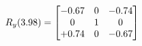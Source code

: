 \documentclass[preview]{standalone}
\begin{document}
\begin{align*}
\special{dvisvgm:raw <g id='unique000'>}R_{y}(3.98) = \begin{bmatrix}-0.67 & 0 & -0.74 \\0 & 1 & 0 \\+0.74 & 0 & -0.67\end{bmatrix}\special{dvisvgm:raw </g>}
\end{align*}
\end{document}
